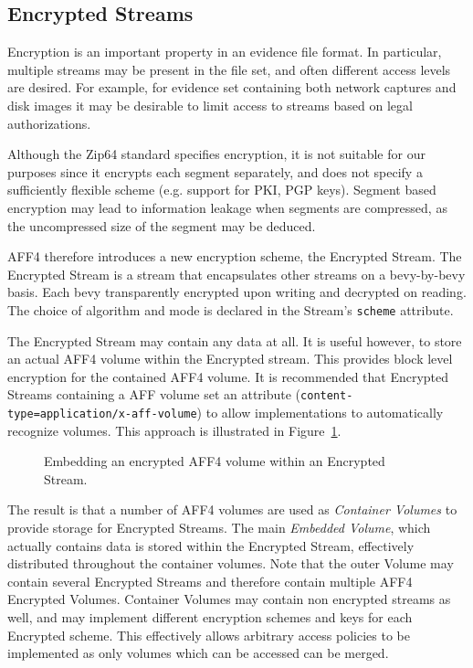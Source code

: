 \documentclass[10pt, conference]{IEEEtran}
\begin{document}
\subsection{Encrypted Streams}
Encryption is an important property in an evidence file format. In
particular, multiple streams may be present in the file set, and often
different access levels are desired. For example, for evidence set
containing both network captures and disk images it may be desirable
to limit access to streams based on legal authorizations.

Although the Zip64 standard specifies encryption, it is not suitable
for our purposes since it encrypts each segment separately, and does
not specify a sufficiently flexible scheme (e.g. support for PKI, PGP
keys). Segment based encryption may lead to information leakage when
segments are compressed, as the uncompressed size of the segment may
be deduced.

AFF4 therefore introduces a new encryption scheme, the Encrypted
Stream.  The Encrypted Stream is a stream that encapsulates other
streams on a bevy-by-bevy basis. Each bevy transparently encrypted upon
writing and decrypted on reading. The choice of algorithm and mode is declared in the
Stream's \texttt{scheme} attribute. 

The Encrypted Stream may contain any data at all. It is useful
however, to store an actual AFF4 volume within the Encrypted
stream. This provides block level encryption for the contained AFF4
volume. It is recommended that Encrypted Streams containing a AFF
volume set an attribute (\texttt{content-type=application/x-aff-volume})
to allow implementations to automatically recognize volumes. This
approach is illustrated in Figure~\ref{crypted_fif}.

\begin{figure}[tb]
  \begin{center}
  \mbox{\columnwidth {}}
  \caption{Embedding an encrypted AFF4 volume within an Encrypted Stream.}
  \label{crypted_fif}
  \end{center}
\end{figure}

The result is that a number of AFF4 volumes are used as {\em Container
Volumes} to provide storage for Encrypted Streams. The main {\em
Embedded Volume}, which actually contains data is stored within the
Encrypted Stream, effectively distributed throughout the container
volumes. Note that the outer Volume may contain several Encrypted
Streams and therefore contain multiple AFF4 Encrypted 
Volumes. Container Volumes may contain non encrypted streams as well,
and may implement different encryption schemes and keys for each
Encrypted scheme. This effectively allows arbitrary access policies to
be implemented as only volumes which can be accessed can be merged.
\end{document}
